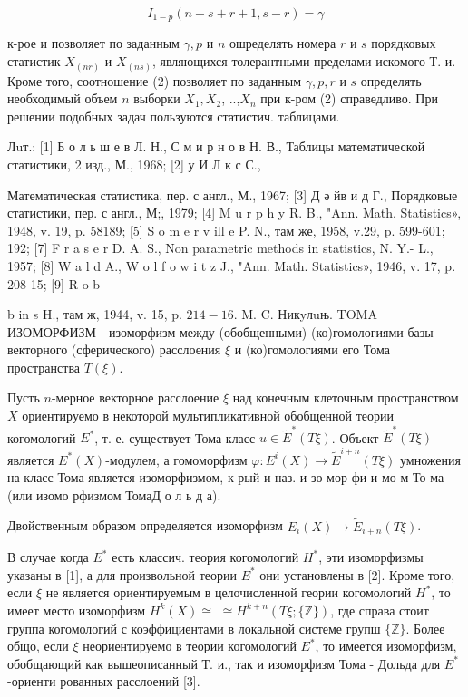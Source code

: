 \documentclass[10pt]{article}
\begin{document}
\[

I_{1-p}(n-s+r+1, s-r)=\gamma

\]



к-рое и позволяет по заданным $\gamma, p$ и $n$ ошределять номера $r$ и $s$ порядковых статистик $X_{(n r)}$ и $X_{(n s)}$, являющихся толерантными пределами искомого Т. и. Кроме того, соотношение (2) позволяет по заданным $\gamma, p, r$ и $s$ определять необходимый объем $n$ выборки $X_{1}, X_{2}$, ..,$X_{n}$ при к-ром (2) справедливо. При решении подобных задач пользуются статистич. таблицами.



Лuт.: [1] Б о л ь ш е в Л. Н., С м и р н о в Н. В., Таблицы математической статистики, 2 изд., М., 1968; [2] у И Л к с С.,

Математическая статистика, пер. с англ., М., 1967; [3] Д ә йв и д Г., Порядковые статистики, пер. с англ., М;, 1979; [4] M u r p h y R. B., "Ann. Math. Statistics», 1948, v. 19, p. 58189; [5] S o m e r v ill e P. N., там же, 1958, v.29, p. 599-601; 192; [7] F r a s e r D. A. S., Non parametric methods in statistics, N. Y.- L., 1957; [8] W a l d A., W o l f o w i t z J., "Ann. Math. Statistics», 1946, v. 17, p. 208-15; [9] R o b-

b in s H., там $ж$, 1944, v. 15, p. $214-16$. M. C. Никyлuњ. TOMA ИЗОМОРФИЗМ - изоморфизм между (обобщенными) (ко)гомологиями базы векторного (сферического) расслоения $\xi$ и (ко)гомологиями его Тома пространства $T(\xi)$.



Пусть $n$-мерное векторное расслоение $\xi$ над конечным клеточным пространством $X$ ориентируемо в некоторой мультипликативной обобщенной теории когомологий $E^{*}$, т. е. существует Тома класс $u \in \tilde{E}^{*}(T \xi)$. Объект $\tilde{E}^{*}(T \xi)$ является $E^{*}(X)$-модулем, а гомоморфизм $\varphi: E^{i}(X) \rightarrow \tilde{E}^{i+n}(T \xi)$ умножения на класс Тома является изоморфизмом, к-рый и наз. и зо мор фи и мо м То ма (или изомо рфизмом ТомаД о л ь д а).



Двойственным образом определяется изоморфизм $E_{i}(X) \rightarrow \tilde{E}_{i+n}(T \xi)$.



В случае когда $E^{*}$ есть классич. теория когомологий $H^{*}$, эти изоморфизмы указаны в [1], а для произвольной теории $E^{*}$ они установлены в [2]. Кроме того, если $\xi$ не является ориентируемым в целочисленной геории когомологий $H^{*}$, то имеет место изоморфизм $H^{k}(X) \cong$ $\cong H^{k+n}(T \xi ;\{\mathbb{Z}\})$, где справа стоит группа когомологий с коэффициентами в локальной системе групш $\{\mathbb{Z}\}$. Более общо, если $\xi$ неориентируемо в теории когомологий $E^{*}$, то имеется изоморфизм, обобщающий как вышеописанный Т. и., так и изоморфизм Тома - Дольда для $E^{*}$-ориенти рованных расслоений [3].
\end{document}
